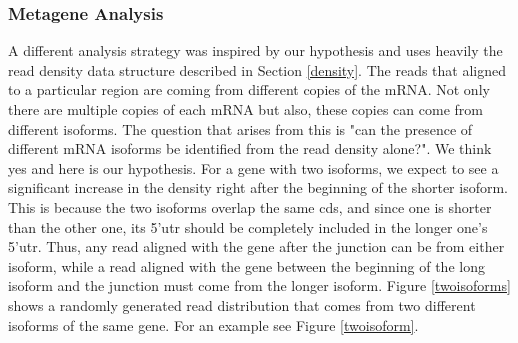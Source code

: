 \documentclass[12pt]{article}
\begin{document}
\subsubsection{Metagene Analysis}\label{metagene_sect}
A different analysis strategy was inspired by our hypothesis and uses heavily the read density data structure described in Section \ref{density}. The reads that aligned to a particular region are coming from different copies of the mRNA. Not only there are multiple copies of each mRNA but also, these copies can come from different isoforms. The question that arises from this is "can the presence of different mRNA isoforms be identified from the read density alone?". We think yes and here is our hypothesis. For a gene with two isoforms, we expect to see a significant increase in the density right after the beginning of the shorter isoform. This is because the two isoforms overlap the same \acrshort{cds}, and since one is shorter than the other one, its 5'\acrshort{utr} should be completely included in the longer one's 5'\acrshort{utr}. Thus, any read aligned with the gene after the junction can be from either isoform, while a read aligned with the gene between the beginning of the long isoform and the junction must come from the longer isoform. Figure \ref{twoisoforms} shows a randomly generated read distribution that comes from two different isoforms of the same gene. For an example see Figure \ref{twoisoform}. 


\end{document}
